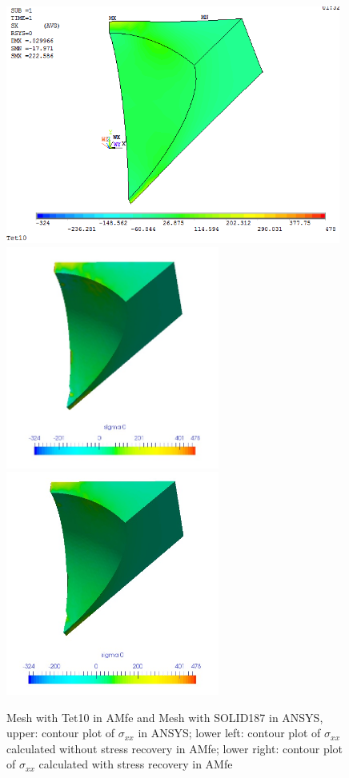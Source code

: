 \begin{figure}[htbp]
	\begin{center}
		\includegraphics[width=11cm,clip]{Tet10_Sxx.png} 	
		\includegraphics[width=7cm,clip]{Tet10_Sxx_PD.png} 			
		\includegraphics[width=7cm,clip]{Tet10_Sxx_P.png} 		
		\caption{Mesh with Tet10 in AMfe and Mesh with SOLID187 in ANSYS, upper: contour plot of $\sigma_{xx}$ in ANSYS; lower left: contour plot of $\sigma_{xx}$ calculated without stress recovery in AMfe; lower right: contour plot of $\sigma_{xx}$ calculated with stress recovery in AMfe} \label{fig: Tet10_Sxx}
	\end{center}
\end{figure}
\clearpage 

